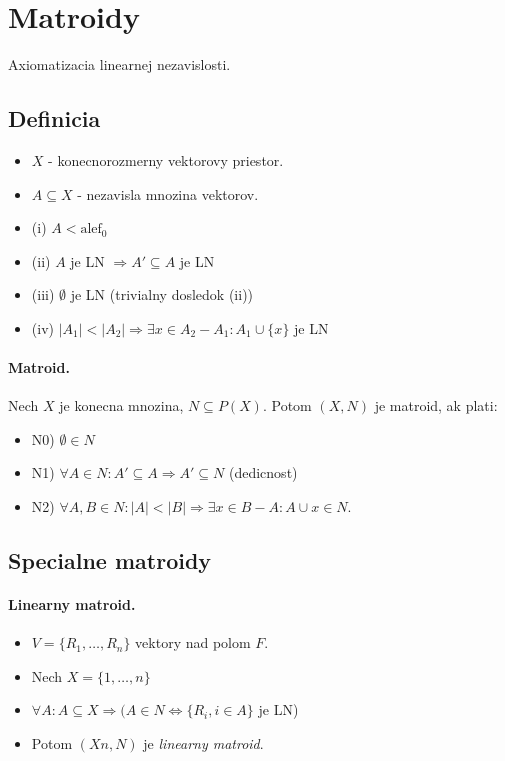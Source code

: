 \documentclass[10pt,a4paper]{article}
\begin{document}
\section{Matroidy}
Axiomatizacia linearnej nezavislosti. 

\subsection{Definicia}
\begin{itemize}
\item $X$ - konecnorozmerny vektorovy priestor. 
\item $A \subseteq X$ - nezavisla mnozina vektorov. 
\item (i) $A < \textrm{alef}_0$
\item (ii) $A$ je LN $\Rightarrow A' \subseteq A$ je LN 
\item (iii) $\emptyset$ je LN (trivialny dosledok (ii))
\item (iv) $|A_1| < |A_2| \Rightarrow \exists x\in A_2 - A_1 : A_1 \cup \{x\}$ je LN
\end{itemize}

\paragraph{Matroid.}
Nech $X$ je konecna mnozina, $N \subseteq P(X)$. Potom $(X,N)$ je matroid, ak plati: 
\begin{itemize}
\item N0) $\emptyset \in N$
\item N1) $\forall A \in N: A' \subseteq A \Rightarrow A' \subseteq N$ (dedicnost)
\item N2) $\forall A,B \in N: |A|<|B| \Rightarrow \exists x \in B-A : A \cup {x} \in N$. 
\end{itemize}

\subsection{Specialne matroidy} 
\paragraph{Linearny matroid.} 
\begin{itemize}
\item $V = \{ R_1, \ldots, R_n\}$ vektory nad polom $F$. 
\item Nech $X = \{1, \ldots, n\}$
\item $\forall A: A \subseteq X \Rightarrow (A \in N \Leftrightarrow \{R_i, i \in A\}$ je LN)
\item Potom $(Xn, N)$ je \emph{linearny matroid}. 
\end{itemize}
\end{document}
